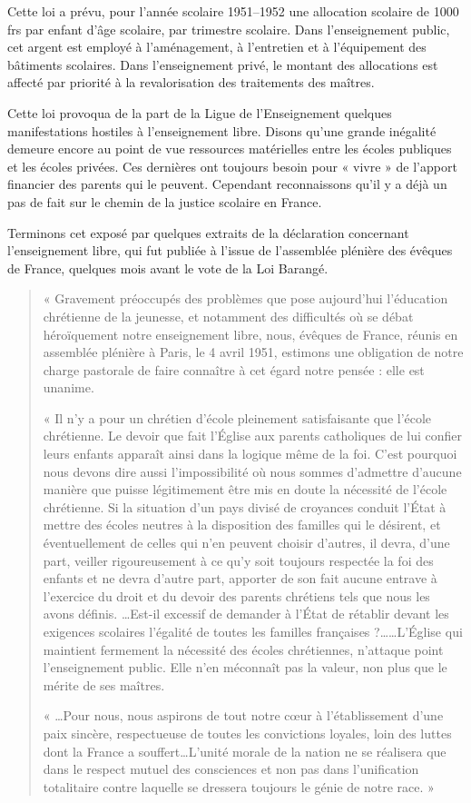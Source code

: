 Cette loi a prévu, pour l'année scolaire 1951--1952 une allocation scolaire de 1000 frs par enfant d'âge scolaire, par trimestre scolaire. Dans l'enseignement public, cet argent est employé à l'aménagement, à l'entretien et à l'équipement des bâtiments scolaires. Dans l'enseignement privé, le montant des allocations est affecté par priorité à la revalorisation des traitements des maîtres.

Cette loi provoqua de la part de la Ligue de l'Enseignement quelques manifestations hostiles à l'enseignement libre. Disons qu'une grande inégalité demeure encore au point de vue ressources matérielles entre les écoles publiques et les écoles privées. Ces dernières ont toujours besoin pour « vivre » de l'apport financier des parents qui le peuvent. Cependant reconnaissons qu'il y a déjà un pas de fait sur le chemin de la justice scolaire en France.

Terminons cet exposé par quelques extraits de la déclaration concernant l'enseignement libre, qui fut publiée à l'issue de l'assemblée plénière des évêques de France, quelques mois avant le vote de la Loi Barangé.

\begin{quote}
« Gravement préoccupés des problèmes que pose aujourd'hui l'éducation chrétienne de la jeunesse, et notamment des difficultés où se débat héroïquement notre enseignement libre, nous, évêques de France, réunis en assemblée plénière à Paris, le 4 avril 1951, estimons une obligation de notre charge pastorale de faire connaître à cet égard notre pensée : elle est unanime.

« Il n'y a pour un chrétien d'école pleinement satisfaisante que l'école chrétienne. Le devoir que fait l'Église aux parents catholiques de lui confier leurs enfants apparaît ainsi dans la logique même de la foi. C'est pourquoi nous devons dire aussi l'impossibilité où nous sommes d'admettre d'aucune manière que puisse légitimement être mis en doute la nécessité de l'école chrétienne. Si la situation d'un pays divisé de croyances conduit l'État à mettre des écoles neutres à la disposition des familles qui le désirent, et éventuellement de celles qui n'en peuvent choisir d'autres, il devra, d'une part, veiller rigoureusement à ce qu'y soit toujours respectée la foi des enfants et ne devra d'autre part, apporter de son fait aucune entrave à l'exercice du droit et du devoir des parents chrétiens tels que nous les avons définis. …Est-il excessif de demander à l'État de rétablir devant les exigences scolaires l'égalité de toutes les familles françaises ?……L'Église qui maintient fermement la nécessité des écoles chrétiennes, n'attaque point l'enseignement public. Elle n'en méconnaît pas la valeur, non plus que le mérite de ses maîtres.

« …Pour nous, nous aspirons de tout notre cœur à l'établissement d'une paix sincère, respectueuse de toutes les convictions loyales, loin des luttes dont la France a souffert…L'unité morale de la nation ne se réalisera que dans le respect mutuel des consciences et non pas dans l'unification totalitaire contre laquelle se dressera toujours le génie de notre race. »
\end{quote}
